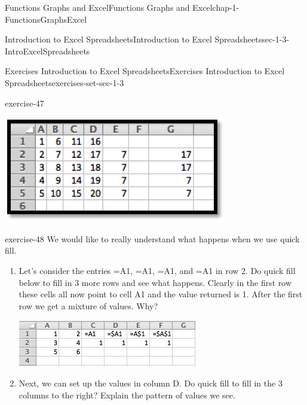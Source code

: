\documentclass[oneside,10pt,]{book}
\numberwithin{equation}{section}
\begin{document}
\begin{chapterptx}{Functions Graphs and Excel}{}{Functions Graphs and Excel}{}{}{chap-1-FunctionsGraphsExcel}
\begin{sectionptx}{Introduction to Excel Spreadsheets}{}{Introduction to Excel Spreadsheets}{}{}{sec-1-3-IntroExcelSpreadsheets}
\begin{exercises-subsection-numberless}{Exercises Introduction to Excel Spreadsheets}{}{Exercises Introduction to Excel Spreadsheets}{}{}{exercises-set-sec-1-3}
\begin{divisionexercise}{5}{}{}{exercise-47}
\begin{sidebyside}{1}{0.1}{0.1}{0}
\begin{sbspanel}{0.8}
\includegraphics[width=1\linewidth]{images/sec1-3-sol5b.png}
\end{sbspanel}%
\end{sidebyside}%
%
\end{divisionexercise}%
\begin{divisionexercise}{6}{}{}{exercise-48}%
\hypertarget{p-294}{}%
We would like to really understand what happens when we use quick fill.%
\leavevmode%
\begin{enumerate}[label=(\Alph*)]
\item\hypertarget{li-96}{}\hypertarget{p-295}{}%
Let's consider the entries =A1, =\textdollar{}A1, =A\textdollar{}1, and =\textdollar{}A\textdollar{}1 in row 2.  Do quick fill below to fill in 3 more rows and see what happens. Clearly in the first row these cells all now point to cell A1 and the value returned is 1. After the first row we get a mixture of values. Why?%
\begin{sidebyside}{1}{0.1}{0.1}{0}%
\begin{sbspanel}{0.8}%
\includegraphics[width=1\linewidth]{images/sec1-3-e3.png}
\end{sbspanel}%
\end{sidebyside}%
\item\hypertarget{li-97}{}\hypertarget{p-296}{}%
Next, we can set up the values in column D. Do quick fill to fill in the 3 columns to the right? Explain the pattern of values we see. \leavevmode%
\begin{sidebyside}{1}{0.1}{0.1}{0}%
\begin{sbspanel}{0.8}%

\end{sbspanel}
\end{sidebyside}
\end{enumerate}
\end{divisionexercise}
\end{exercises-subsection-numberless}
\end{sectionptx}
\end{chapterptx}
\end{document}
